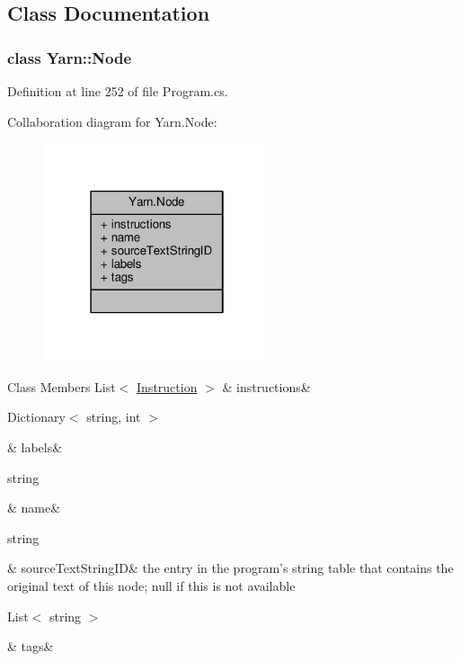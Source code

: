 \subsection{Class Documentation}
\label{a00382}
\hypertarget{a00053_a00382}{}
\subsubsection{class Yarn\-:\-:Node}


Definition at line 252 of file Program.\-cs.



Collaboration diagram for Yarn.\-Node\-:
\nopagebreak
\begin{figure}[H]
\begin{center}
\leavevmode
\includegraphics[width=190pt]{a00396}
\end{center}
\end{figure}
\begin{DoxyFields}{Class Members}
\hypertarget{a00053_a156723a9252b62d288ddf611939ea7c3}{List$<$ \hyperlink{a00121}{Instruction} $>$}\label{a00053_a156723a9252b62d288ddf611939ea7c3}
&
instructions&
\\
\hline

\hypertarget{a00053_a9afa49f4fbc72e806a0210cb4198f12e}{Dictionary$<$ string, int $>$}\label{a00053_a9afa49f4fbc72e806a0210cb4198f12e}
&
labels&
\\
\hline

\hypertarget{a00053_a107b0de3fcfc65e99913edc01b5ce9db}{string}\label{a00053_a107b0de3fcfc65e99913edc01b5ce9db}
&
name&
\\
\hline

\hypertarget{a00053_a09c6af5b50925d0876283b84281b3ed4}{string}\label{a00053_a09c6af5b50925d0876283b84281b3ed4}
&
source\-Text\-String\-I\-D&
the entry in the program's string table that contains the original text of this node; null if this is not available \\
\hline

\hypertarget{a00053_a811086feceebbe79a74eba071c1d516b}{List$<$ string $>$}\label{a00053_a811086feceebbe79a74eba071c1d516b}
&
tags&
\\
\hline

\end{DoxyFields}
